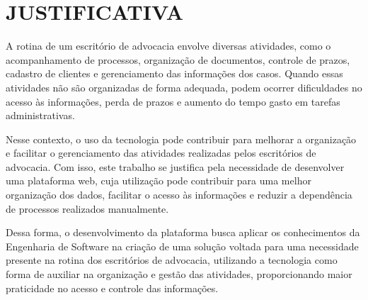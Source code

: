 \section{JUSTIFICATIVA}

A rotina de um escritório de advocacia envolve diversas atividades, como o acompanhamento de processos, organização de documentos, controle de prazos, cadastro de clientes e gerenciamento das informações dos casos. Quando essas atividades não são organizadas de forma adequada, podem ocorrer dificuldades no acesso às informações, perda de prazos e aumento do tempo gasto em tarefas administrativas.

Nesse contexto, o uso da tecnologia pode contribuir para melhorar a organização e facilitar o gerenciamento das atividades realizadas pelos escritórios de advocacia. Com isso, este trabalho se justifica pela necessidade de desenvolver uma plataforma web, cuja utilização pode contribuir para uma melhor organização dos dados, facilitar o acesso às informações e reduzir a dependência de processos realizados manualmente.

Dessa forma, o desenvolvimento da plataforma busca aplicar os conhecimentos da Engenharia de Software na criação de uma solução voltada para uma necessidade presente na rotina dos escritórios de advocacia, utilizando a tecnologia como forma de auxiliar na organização e gestão das atividades, proporcionando maior praticidade no acesso e controle das informações.